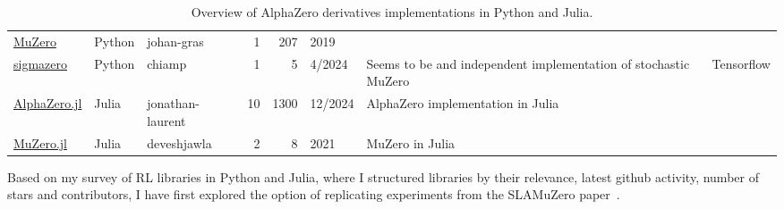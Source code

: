 \documentclass[12pt]{article}
\begin{document}
\begin{table}
\begin{adjustbox}{width=\textwidth}
\begin{tabular}{lllrrlp{6cm}l}
        \href{https://github.com/johan-gras/MuZero}{MuZero} &   Python &       johan-gras &             1 &    207 &        2019 &                                                                                                                                                                                                                                                                                             &         \\
        \href{https://github.com/chiamp/sigmazero}{sigmazero} &   Python &           chiamp &             1 &      5 &      4/2024 &                                                                                                                                                                                                                              Seems to be and independent implementation of stochastic MuZero & Tensorflow \\
        \href{https://github.com/jonathan-laurent/AlphaZero.jl}{AlphaZero.jl} &    Julia & jonathan-laurent &            10 &   1300 &     12/2024 &                                                                                                                                                                                                                                                              AlphaZero implementation in Julia &         \\
        \href{https://github.com/deveshjawla/MuZero.jl}{MuZero.jl} &    Julia &      deveshjawla &             2 &      8 &        2021 &                                                                                                                                                                                                                                                                                MuZero in Julia &         \\
        \bottomrule
    \end{tabular}
    \end{adjustbox}
    \caption{Overview of AlphaZero derivatives implementations in Python and Julia.}
\end{table}
    
Based on my survey of RL libraries in Python and Julia, where I structured libraries by their relevance, latest github activity, number of stars and contributors, I have first explored the option of replicating experiments from the SLAMuZero paper~\cite{fangSLAMuZeroPlanLearn2024}. 
\end{document}

